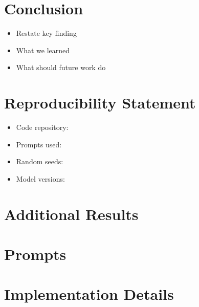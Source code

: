 \documentclass[11pt]{article}
\begin{document}
\section{Conclusion}

\begin{itemize}
    \item Restate key finding
    \item What we learned
    \item What should future work do
\end{itemize}

\section*{Reproducibility Statement}

\begin{itemize}
    \item Code repository:
    \item Prompts used:
    \item Random seeds:
    \item Model versions:
\end{itemize}


% 

\appendix

\section{Additional Results}

\section{Prompts}

\section{Implementation Details}
\end{document}
